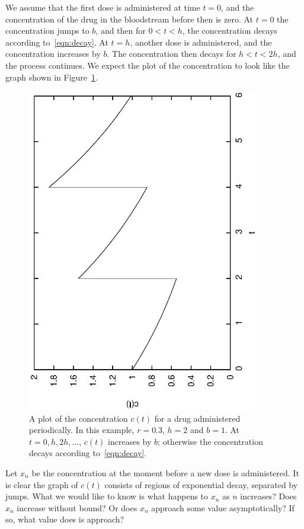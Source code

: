 We assume that the first dose is administered at time $t=0$, and
the concentration of the drug in the bloodstream before then
is zero.  At $t=0$ the concentration jumps to $b$, and then
for $0 < t < h$, the concentration decays according
to~\eqref{eqn:decay}.  At $t=h$, another dose is administered,
and the concentration increases by $b$. The concentration then decays
for $h < t < 2h$, and the process continues.
We expect the plot of the concentration to look like
the graph shown in Figure~\ref{fig:PeriodicDrugDosePlot}.
\begin{figure}
\centerline{%
\includegraphics[angle=270,width=4in]{python_PeriodicDrugDose/PeriodicDrugDosePlot.eps}
}
\caption{A plot of the concentration $c(t)$ for a drug administered
periodically.  In this example, $r=0.3$, $h=2$ and $b=1$.
At $t=0, h, 2h, \ldots$, $c(t)$ increases by $b$; otherwise
the concentration decays according to~\eqref{eqn:decay}.}
\label{fig:PeriodicDrugDosePlot}
\end{figure}


Let $x_n$ be the concentration at the moment before
a new dose is administered.
It is clear the graph of $c(t)$ consists of
regions of exponential decay, separated by jumps.  What we would like to
know is what happens to $x_n$ as $n$ increases?
Does $x_n$ increase without bound? Or does $x_n$ approach
some value asymptotically?  If so, what value does is approach?

